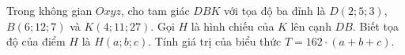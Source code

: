 \begin{ex}
Trong không gian $Oxyz$, cho tam giác $DBK$ với tọa độ ba đỉnh là $D(2;5;3)$, $B(6;12;7)$ và $K(4;11;27)$. Gọi $H$ là hình chiếu của $K$ lên cạnh $DB$. Biết tọa độ của điểm $H$ là $H(a;b;c)$. Tính giá trị của biểu thức $T=162\cdot(a+b+c)$.
\end{ex}
